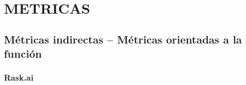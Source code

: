 \newcommand{\metrica}{../img/metricas/1.png}
\newcommand{\metricas}{../img/metricas/2.png}




\section{METRICAS}
\subsection{Métricas indirectas – Métricas orientadas a la función}
\subsubsection{Rask.ai}

